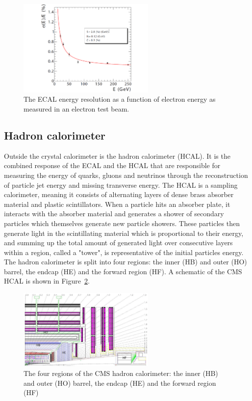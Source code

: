 \begin{figure}[h] 
    \centering
    \includegraphics[width=0.6\textwidth]{figures/cms/ECAL-energy-resolution.pdf}
    \caption{The ECAL energy resolution as a function of electron energy as measured in an electron test beam.~\cite{Adzic:2007mi}}
    \label{fig:cms:ecal-res}
\end{figure}


\subsection{Hadron calorimeter}
Outside the crystal calorimeter is the hadron calorimeter (HCAL). It is the combined response of the ECAL and the HCAL that are responsible for measuring the energy of quarks, gluons and neutrinos through the reconstruction of particle jet energy and missing transverse energy. 
The HCAL is a sampling calorimeter, meaning it consists of alternating layers of dense brass absorber material and plastic scintillators. When a particle hits an absorber plate, it interacts with the absorber material and generates a shower of secondary particles which themselves generate new particle showers. These particles then generate light in the scintillating material which is proportional to their energy, and summing up the total amount of generated light over consecutive layers within a region, called a "tower", is representative of the initial particles energy.
The hadron calorimeter is split into four regions: the inner (HB) and outer (HO) barrel, the endcap (HE) and the forward region (HF).
A schematic of the CMS HCAL is shown in Figure~\ref{fig:cms:hcal}.

\begin{figure}[h] 
    \centering
    \includegraphics[width=0.6\textwidth]{figures/cms/HCAL.png}
    \caption{The four regions of the CMS hadron calorimeter:  the inner (HB) and outer (HO) barrel, the endcap (HE) and the forward region (HF)~\cite{Chatrchyan:2008aa}}
    \label{fig:cms:hcal}
\end{figure}

